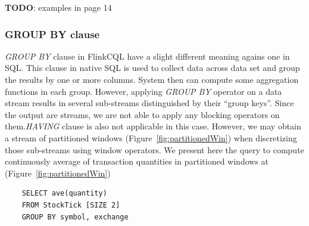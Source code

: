 \textbf{TODO}: examples in \citep{Kramer:2009} page 14
\subsubsection*{GROUP BY clause}
\textit{GROUP BY} clause in FlinkCQL have a slight different meaning agains one in SQL. This clause in native SQL is used to collect data across data set and group the results by one or more columns. System then can compute some aggregation functions in each group. However, applying \textit{GROUP BY} operator on a data stream results in several sub-streams distinguished by their ``group keys''. Since the output are streams, we are not able to apply any blocking operators on them.\textit{HAVING} clause is also not applicable in this case. However,  we may obtain a stream of partitioned windows (Figure~\ref{fig:partitionedWin}) when discretizing those sub-streams using window operators. We present here the query to compute continuously average of transaction quantities in partitioned windows at  (Figure~\ref{fig:partitionedWin})
\begin{lstlisting}
	SELECT ave(quantity)
	FROM StockTick [SIZE 2]
	GROUP BY symbol, exchange
\end{lstlisting}


